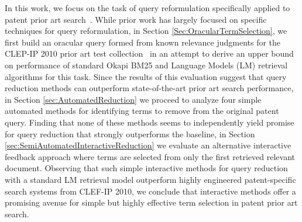 %
%
In this work, we focus on the task of query
reformulation
specifically applied to patent
prior art
search~\cite{mahdabi2014patent,xue2009transforming}.  While
prior work has largely focused on specific techniques for query
reformulation, in Section \ref{Sec:OracularTermSelection}, we first
build an oracular query formed from known relevance judgments for the
CLEP-IP 2010 prior art test collection~\cite{piroi2010clef} in an attempt
to derive an upper bound on performance of standard Okapi BM25 and
Language Models (LM) retrieval algorithms for this task.  Since the
results of this evaluation suggest that query reduction methods can
outperform state-of-the-art prior art search performance, in Section
\ref{sec:AutomatedReduction} we proceed to analyze four simple
automated methods for identifying terms to remove from the original
patent query.  Finding that none of these methods seems to
independently yield promise for query reduction that strongly
outperforms the baseline, in Section
\ref{sec:SemiAutomatedInteractiveReduction} we evaluate an alternative
interactive feedback approach where terms are selected from only the
first retrieved relevant document.  Observing that such simple
interactive methods for query reduction with a standard LM retrieval
model outperform highly engineered patent-specific search systems from
CLEF-IP 2010, we conclude that interactive methods offer a promising
avenue for simple but highly effective term selection in patent prior
art search.



